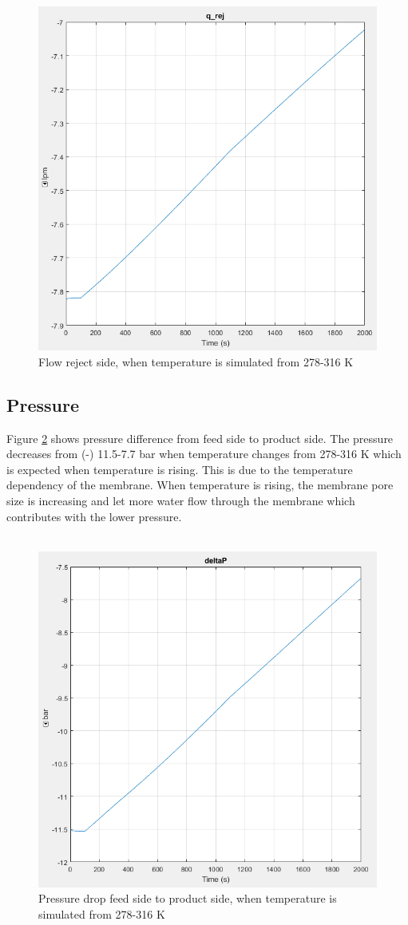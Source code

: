 \begin{figure}[H]
  \centering
  \includegraphics[width=0.6\linewidth]{q_rej.PNG}
  \caption{Flow reject side, when temperature is simulated from 278-316 K}
  \label{fig:qrej}
\end{figure}
\newpage

\subsection{Pressure}
Figure \ref{fig:deltap} shows pressure difference from feed side to product side. The pressure decreases from (-) 11.5-7.7 bar when temperature changes from 278-316 K which is expected when temperature is rising. This is due to the temperature dependency of the membrane. When temperature is rising, the membrane pore size is increasing and let more water flow through the membrane which contributes with the lower pressure. \\
\\
\begin{figure}[H]
  \centering
  \includegraphics[width=0.7\linewidth]{deltap.PNG}
  \caption{Pressure drop feed side to product side, when temperature is simulated from 278-316 K}
  \label{fig:deltap}
\end{figure}
\newpage

